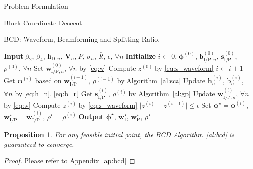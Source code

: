 \documentclass[journal]{IEEEtran}
\newtheorem{proposition}{Proposition}
\begin{document}
\begin{section}{Problem Formulation}
\begin{subsection}{Block Coordinate Descent}
			\begin{algorithm}[!t]
				\caption{BCD: Waveform, Beamforming and Splitting Ratio.}
				\label{al:bcd}
				\begin{algorithmic}[1]
					\State \textbf{Input} $\beta_2$, $\beta_4$, $\boldsymbol{h}_{\mathrm{D},n}$, $\boldsymbol{V}_{n}$, $P$, $\sigma_n$, $\bar{R}$, $\epsilon$, $\forall n$
					\State \textbf{Initialize} $i \gets 0$, $\boldsymbol{\phi}^{(0)}$, $\boldsymbol{b}_{\mathrm{I/P},n}^{(0)}$, $\boldsymbol{s}_{\mathrm{I/P}}^{(0)}$, $\rho^{(0)}$, $\forall n$
					\State Set $\boldsymbol{w}_{\mathrm{I/P},n}^{(0)}$, $\forall n$ by \eqref{eq:w}
					\State Compute $z^{(0)}$ by \eqref{eq:z_waveform}
					\Repeat
						\State $i \gets i + 1$
						\State Get $\boldsymbol{\phi}^{(i)}$ based on $\boldsymbol{w}_{\mathrm{I/P}}^{(i-1)}$, $\rho^{(i-1)}$ by Algorithm~\ref{al:sca}
						\State Update $\boldsymbol{h}_n^{(i)}$, $\boldsymbol{b}_n^{(i)}$, $\forall n$ by \eqref{eq:h_n}, \eqref{eq:b_n}
						\State Get $\boldsymbol{s}_{\mathrm{I/P}}^{(i)}$, $\rho^{(i)}$ by Algorithm~\ref{al:gp}
						\State Update $\boldsymbol{w}_{\mathrm{I/P},n}^{(i)}$, $\forall n$ by \eqref{eq:w}
						\State Compute $z^{(i)}$ by \eqref{eq:z_waveform}
					\Until $\lvert z^{(i)} - z^{(i-1)} \rvert \le \epsilon$
					\State Set $\boldsymbol{\phi}^{\star}=\boldsymbol{\phi}^{(i)}$, $\boldsymbol{w}_{\mathrm{I/P}}^{\star}=\boldsymbol{w}_{\mathrm{I/P}}^{(i)}$, $\rho^{\star}=\rho^{(i)}$
					\State \textbf{Output} $\boldsymbol{\phi}^{\star}$, $\boldsymbol{w}_{\mathrm{I}}^{\star}$, $\boldsymbol{w}_{\mathrm{P}}^{\star}$, $\rho^{\star}$
				\end{algorithmic}
			\end{algorithm}

			\begin{proposition}\label{pr:bcd}
				For any feasible initial point, the BCD Algorithm~\ref{al:bcd} is guaranteed to converge.
			\end{proposition}

			\begin{proof}\label{pf:bcd}
				Please refer to Appendix~\ref{ap:bcd}
			\end{proof}


\end{subsection}
\end{section}
\end{document}
